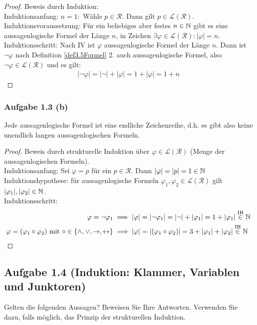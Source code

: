 \begin{proof}
	Beweis durch Induktion:\\
	Induktionsanfang: $n=1:$ Wähle $p\in\mathcal{R}$. 
	Dann gilt $p\in\mathcal{L}(\mathcal{R})$.\\
	Induktionsvoraussetzung: Für ein beliebiges aber festes $n\in\mathbb{N}$ gibt es eine aussagenlogische Formel der Länge $n$, in Zeichen 
	$\exists\varphi\in\mathcal{L}(\mathcal{R}):|\varphi|=n$.\\
	Induktionsschritt: Nach IV ist $\varphi$ aussagenlogische Formel der Länge $n$. 
	Dann ist $\neg\varphi$ nach Definition \ref{def3.5Formel} 2. auch aussagenlogische Formel, also 
	$\neg\varphi\in\mathcal{L}(\mathcal{R})$ und es gilt:
	\begin{align*}
		|\neg\varphi|=|\neg|+|\varphi|=1+|\varphi|=1+n	
	\end{align*}
\end{proof}

\subsubsection{Aufgabe 1.3 (b)}
Jede aussagenlogische Formel ist eine endliche Zeichenreihe,
d.h. es gibt also keine unendlich langen aussagenlogischen Formeln.

\begin{proof}
	Beweis durch strukturelle Induktion über $\varphi\in\mathcal{L}(\mathcal{R})$ (Menge der aussagenlogischen Formeln).\\
	Induktionsanfang: Sei $\varphi=p$ für ein $p\in\mathcal{R}$. Dann $|\varphi|=|p|=1\in\mathbb{N}$\\
	Induktionshypothese: für aussagenlogische Formeln $\varphi_1,\varphi_2\in\mathcal{L}(\mathcal{R})$ gilt $|\varphi_1|,|\varphi_2|\in\mathbb{N}$.\\
	Induktionsschritt: 
	\begin{align*}
		\varphi=\neg\varphi_1&\implies|\varphi|=|\neg\varphi_1|=|\neg|+|\varphi_1|=1+|\varphi_1|\stackrel{\text{IH}}{\in}\mathbb{N}\\
		\varphi=(\varphi_1\circ\varphi_2)\text{ mit }\circ\in\lbrace\wedge,\vee,\to,\leftrightarrow\rbrace&\implies|\varphi|=|(\varphi_1\circ\varphi_2)|=3+|\varphi_1|+|\varphi_2|\stackrel{\text{IH}}{\in}\mathbb{N}
	\end{align*}
\end{proof}

\subsection{Aufgabe 1.4 (Induktion: Klammer, Variablen und Junktoren)}
Gelten die folgenden Aussagen? Beweisen Sie Ihre Antworten. 
Verwenden Sie dazu, falls
möglich, das Prinzip der strukturellen Induktion.

